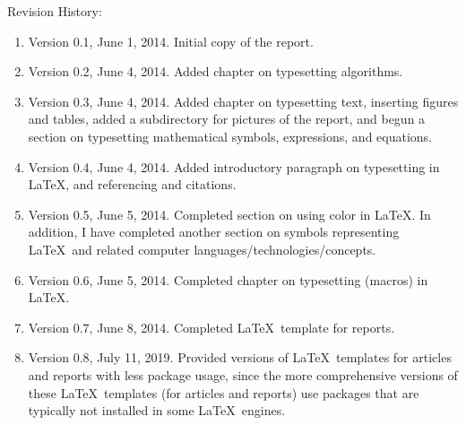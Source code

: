 Revision History: \vspace{-0.3cm}
\begin{enumerate} \itemsep -4pt
\item Version 0.1, June 1, 2014. Initial copy of the report.
\item Version 0.2, June 4, 2014. Added chapter on typesetting algorithms.
\item Version 0.3, June 4, 2014. Added chapter on typesetting text, inserting figures and tables, added a subdirectory for pictures of the report, and begun a section on typesetting mathematical symbols, expressions, and equations.
\item Version 0.4, June 4, 2014. Added introductory paragraph on typesetting in \LaTeX, and referencing and citations.
\item Version 0.5, June 5, 2014. Completed section on using color in \LaTeX. In addition, I have completed another section on symbols representing \LaTeX\ and related computer languages/technologies/concepts.
\item Version 0.6, June 5, 2014. Completed chapter on typesetting (macros) in \LaTeX.
\item Version 0.7, June 8, 2014. Completed \LaTeX\ template for reports.
\item Version 0.8, July 11, 2019. Provided versions of \LaTeX\ templates for articles and reports with less package usage, since the more comprehensive versions of these \LaTeX\ templates (for articles and reports) use packages that are typically not installed in some \LaTeX\ engines.
\end{enumerate}


